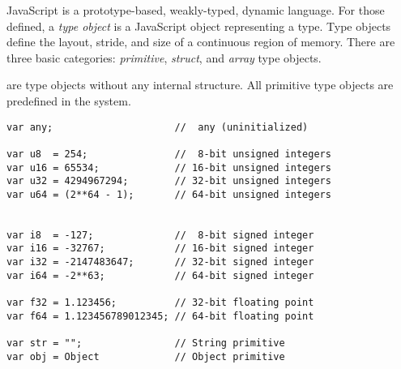 \begin{center}
\begin{minipage}{0.75\dimexpr\paperwidth}
\hspace{-1em}JavaScript is a prototype-based, weakly-typed, dynamic language. For 
those defined, a \textit{type object} is a JavaScript object representing a type. Type objects define 
the layout, stride, and size of a continuous region of memory. There are three basic 
categories: \textit{primitive}, \textit{struct}, and \textit{array} type objects. \\
\end{minipage}

\begin{minipage}{0.7\dimexpr\paperwidth}
\hspace{-1em} are type objects without any internal structure. All 
primitive type objects are predefined in the system. 

\begin{lstfloat}
\begin{lstlisting}[style=JS,caption=Primitive type objects]
var any;                     //  any (uninitialized)

var u8  = 254;               //  8-bit unsigned integers 
var u16 = 65534;             // 16-bit unsigned integers 
var u32 = 4294967294;        // 32-bit unsigned integers 
var u64 = (2**64 - 1);       // 64-bit unsigned integers 


var i8  = -127;              //  8-bit signed integer 
var i16 = -32767;            // 16-bit signed integer
var i32 = -2147483647;       // 32-bit signed integer 
var i64 = -2**63;            // 64-bit signed integer 

var f32 = 1.123456;          // 32-bit floating point
var f64 = 1.123456789012345; // 64-bit floating point

var str = "";                // String primitive
var obj = Object             // Object primitive

\end{lstlisting}
\end{lstfloat}
\end{minipage}


\end{center}
